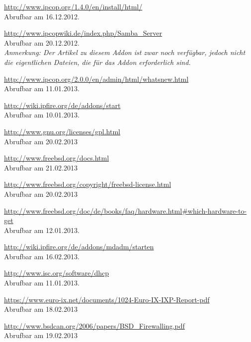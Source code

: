 \documentclass[a4paper,12pt]{scrartcl}
\begin{document}
\renewcommand\refname{Quellenverzeichnis}
\begin{thebibliography}{999}

\url{http://www.ipcop.org/1.4.0/en/install/html/}
\\Abrufbar am 16.12.2012.

\url{http://www.ipcopwiki.de/index.php/Samba\_Server}
\\Abrufbar am 20.12.2012.
\\\textit{Anmerkung: Der Artikel zu diesem Addon ist zwar noch verf\"ugbar, jedoch
nicht die eigentlichen Dateien, die f\"ur das Addon erforderlich sind.}

\url{http://www.ipcop.org/2.0.0/en/admin/html/whatsnew.html}
\\Abrufbar am 11.01.2013.

\url{http://wiki.ipfire.org/de/addons/start}
\\Abrufbar am 10.01.2013.

\url{http://www.gnu.org/licenses/gpl.html}
\\Abrufbar am 20.02.2013

\url{http://www.freebsd.org/docs.html}
\\Abrufbar am 21.02.2013

\url{http://www.freebsd.org/copyright/freebsd-license.html}
\\Abrufbar am 20.02.2013

\url{http://www.freebsd.org/doc/de/books/faq/hardware.html\#which-hardware-to-get}
\\Abrufbar am 12.01.2013.

\url{http://wiki.ipfire.org/de/addons/mdadm/starten}
\\Abrufbar am 16.02.2013.

\url{http://www.isc.org/software/dhcp}
\\Abrufbar am 11.01.2013.

\url{https://www.euro-ix.net/documents/1024-Euro-IX-IXP-Report-pdf}
\\Abrufbar am 18.02.2013

\url{http://www.bsdcan.org/2006/papers/BSD_Firewalling.pdf}
\\Abrufbar am 19.02.2013

\end{thebibliography}
\end{document}
